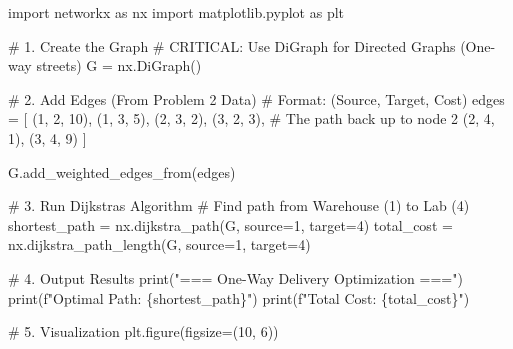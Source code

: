 \documentclass[
  letterpaper,
  DIV=11,
  numbers=noendperiod]{scrreprt}
\newenvironment{Shaded}{\begin{snugshade}}{\end{snugshade}}
\newcommand{\BuiltInTok}[1]{\textcolor[rgb]{0.00,0.23,0.31}{#1}}
\newcommand{\CommentTok}[1]{\textcolor[rgb]{0.37,0.37,0.37}{#1}}
\newcommand{\DecValTok}[1]{\textcolor[rgb]{0.68,0.00,0.00}{#1}}
\newcommand{\ImportTok}[1]{\textcolor[rgb]{0.00,0.46,0.62}{#1}}
\newcommand{\NormalTok}[1]{\textcolor[rgb]{0.00,0.23,0.31}{#1}}
\newcommand{\OperatorTok}[1]{\textcolor[rgb]{0.37,0.37,0.37}{#1}}
\newcommand{\SpecialCharTok}[1]{\textcolor[rgb]{0.37,0.37,0.37}{#1}}
\newcommand{\SpecialStringTok}[1]{\textcolor[rgb]{0.13,0.47,0.30}{#1}}
\newcommand{\StringTok}[1]{\textcolor[rgb]{0.13,0.47,0.30}{#1}}
\begin{document}
\begin{Shaded}
\begin{Highlighting}[]
\ImportTok{import}\NormalTok{ networkx }\ImportTok{as}\NormalTok{ nx}
\ImportTok{import}\NormalTok{ matplotlib.pyplot }\ImportTok{as}\NormalTok{ plt}

\CommentTok{\# 1. Create the Graph}
\CommentTok{\# CRITICAL: Use DiGraph for Directed Graphs (One{-}way streets)}
\NormalTok{G }\OperatorTok{=}\NormalTok{ nx.DiGraph()}

\CommentTok{\# 2. Add Edges (From Problem 2 Data)}
\CommentTok{\# Format: (Source, Target, Cost)}
\NormalTok{edges }\OperatorTok{=}\NormalTok{ [}
\NormalTok{    (}\DecValTok{1}\NormalTok{, }\DecValTok{2}\NormalTok{, }\DecValTok{10}\NormalTok{),}
\NormalTok{    (}\DecValTok{1}\NormalTok{, }\DecValTok{3}\NormalTok{, }\DecValTok{5}\NormalTok{),}
\NormalTok{    (}\DecValTok{2}\NormalTok{, }\DecValTok{3}\NormalTok{, }\DecValTok{2}\NormalTok{),}
\NormalTok{    (}\DecValTok{3}\NormalTok{, }\DecValTok{2}\NormalTok{, }\DecValTok{3}\NormalTok{), }\CommentTok{\# The path back \textquotesingle{}up\textquotesingle{} to node 2}
\NormalTok{    (}\DecValTok{2}\NormalTok{, }\DecValTok{4}\NormalTok{, }\DecValTok{1}\NormalTok{),}
\NormalTok{    (}\DecValTok{3}\NormalTok{, }\DecValTok{4}\NormalTok{, }\DecValTok{9}\NormalTok{)}
\NormalTok{]}

\NormalTok{G.add\_weighted\_edges\_from(edges)}

\CommentTok{\# 3. Run Dijkstra\textquotesingle{}s Algorithm}
\CommentTok{\# Find path from Warehouse (1) to Lab (4)}
\NormalTok{shortest\_path }\OperatorTok{=}\NormalTok{ nx.dijkstra\_path(G, source}\OperatorTok{=}\DecValTok{1}\NormalTok{, target}\OperatorTok{=}\DecValTok{4}\NormalTok{)}
\NormalTok{total\_cost }\OperatorTok{=}\NormalTok{ nx.dijkstra\_path\_length(G, source}\OperatorTok{=}\DecValTok{1}\NormalTok{, target}\OperatorTok{=}\DecValTok{4}\NormalTok{)}

\CommentTok{\# 4. Output Results}
\BuiltInTok{print}\NormalTok{(}\StringTok{"=== One{-}Way Delivery Optimization ==="}\NormalTok{)}
\BuiltInTok{print}\NormalTok{(}\SpecialStringTok{f"Optimal Path: }\SpecialCharTok{\{}\NormalTok{shortest\_path}\SpecialCharTok{\}}\SpecialStringTok{"}\NormalTok{)}
\BuiltInTok{print}\NormalTok{(}\SpecialStringTok{f"Total Cost: }\SpecialCharTok{\{}\NormalTok{total\_cost}\SpecialCharTok{\}}\SpecialStringTok{"}\NormalTok{)}

\CommentTok{\# 5. Visualization}
\NormalTok{plt.figure(figsize}\OperatorTok{=}\NormalTok{(}\DecValTok{10}\NormalTok{, }\DecValTok{6}\NormalTok{))}


\end{Highlighting}
\end{Shaded}
\end{document}
